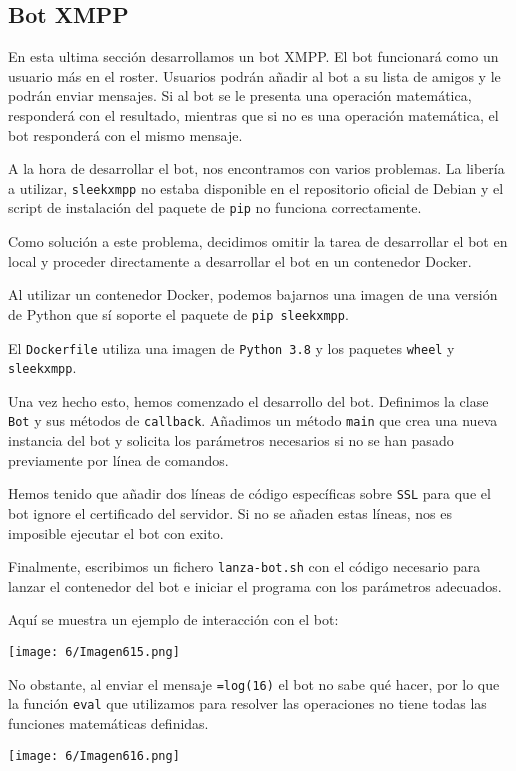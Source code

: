\subsection{Bot XMPP}

En esta ultima sección desarrollamos un bot XMPP.
El bot funcionará como un usuario más en el roster.
Usuarios podrán añadir al bot a su lista de amigos y le podrán enviar mensajes.
Si al bot se le presenta una operación matemática, responderá con el resultado,
mientras que si no es una operación matemática, el bot responderá con el mismo mensaje.

A la hora de desarrollar el bot, nos encontramos con varios problemas.
La libería a utilizar, \lstinline{sleekxmpp} no estaba disponible en el repositorio
oficial de Debian y el script de instalación del paquete de \lstinline{pip} no funciona correctamente.

Como solución a este problema, decidimos omitir la tarea de desarrollar el bot en local
y proceder directamente a desarrollar el bot en un contenedor Docker.

Al utilizar un contenedor Docker, podemos bajarnos una imagen de una versión de Python que sí soporte
el paquete de \lstinline{pip sleekxmpp}.

El \lstinline{Dockerfile} utiliza una imagen de \lstinline{Python 3.8}
y los paquetes \lstinline{wheel} y \lstinline{sleekxmpp}.

Una vez hecho esto, hemos comenzado el desarrollo del bot.
Definimos la clase \lstinline{Bot} y sus métodos de \lstinline{callback}.
Añadimos un método \lstinline{main} que crea una nueva instancia del bot
y solicita los parámetros necesarios si no se han pasado previamente
por línea de comandos.

Hemos tenido que añadir dos líneas de código específicas sobre \lstinline{SSL}
para que el bot ignore el certificado del servidor.
Si no se añaden estas líneas, nos es imposible ejecutar el bot con exito.

Finalmente, escribimos un fichero \lstinline{lanza-bot.sh} con el código necesario
para lanzar el contenedor del bot e iniciar el programa con los parámetros adecuados.

Aquí se muestra un ejemplo de interacción con el bot:

\begin{minipage}{\linewidth}
	\centering
	\texttt{[image: 6/Imagen615.png]}
	\label{fig:6/6}
\end{minipage}

No obstante, al enviar el mensaje \verb#=log(16)#
el bot no sabe qué hacer, por lo que la función \verb#eval#
que utilizamos para resolver las operaciones no tiene todas
las funciones matemáticas definidas.

\begin{minipage}{\linewidth}
	\centering
	\texttt{[image: 6/Imagen616.png]}
	\label{fig:6/7}
\end{minipage}
